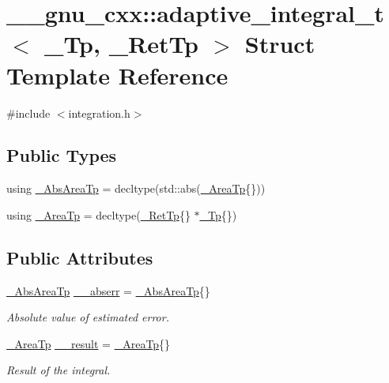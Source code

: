 \hypertarget{struct____gnu__cxx_1_1adaptive__integral__t}{}\section{\+\_\+\+\_\+gnu\+\_\+cxx\+:\+:adaptive\+\_\+integral\+\_\+t$<$ \+\_\+\+Tp, \+\_\+\+Ret\+Tp $>$ Struct Template Reference}
\label{struct____gnu__cxx_1_1adaptive__integral__t}


{\ttfamily \#include $<$integration.\+h$>$}

\subsection*{Public Types}
\begin{DoxyCompactItemize}
\item 
using \hyperlink{struct____gnu__cxx_1_1adaptive__integral__t_a2da7a99af03e272efd03b876a6b28308}{\+\_\+\+Abs\+Area\+Tp} = decltype(std\+::abs(\hyperlink{struct____gnu__cxx_1_1adaptive__integral__t_a9371ae517b6bff468e44130718d90f8b}{\+\_\+\+Area\+Tp}\{\}))
\item 
using \hyperlink{struct____gnu__cxx_1_1adaptive__integral__t_a9371ae517b6bff468e44130718d90f8b}{\+\_\+\+Area\+Tp} = decltype(\hyperlink{namespace____gnu__cxx_a886e03ece3d53ff7fa6c098a40f93fa5}{\+\_\+\+Ret\+Tp}\{\} $\ast$\hyperlink{namespace____gnu__cxx_a3b19a9c800ca194374ef9172290f7d79}{\+\_\+\+Tp}\{\})
\end{DoxyCompactItemize}
\subsection*{Public Attributes}
\begin{DoxyCompactItemize}
\item 
\hyperlink{struct____gnu__cxx_1_1adaptive__integral__t_a2da7a99af03e272efd03b876a6b28308}{\+\_\+\+Abs\+Area\+Tp} \hyperlink{struct____gnu__cxx_1_1adaptive__integral__t_aa0edf7f036470e8eaaaa1d5e5126d8b3}{\+\_\+\+\_\+abserr} = \hyperlink{struct____gnu__cxx_1_1adaptive__integral__t_a2da7a99af03e272efd03b876a6b28308}{\+\_\+\+Abs\+Area\+Tp}\{\}
\begin{DoxyCompactList}\small\item\em Absolute value of estimated error. \end{DoxyCompactList}\item 
\hyperlink{struct____gnu__cxx_1_1adaptive__integral__t_a9371ae517b6bff468e44130718d90f8b}{\+\_\+\+Area\+Tp} \hyperlink{struct____gnu__cxx_1_1adaptive__integral__t_ab868081e535832031b0e75d0e4d0197d}{\+\_\+\+\_\+result} = \hyperlink{struct____gnu__cxx_1_1adaptive__integral__t_a9371ae517b6bff468e44130718d90f8b}{\+\_\+\+Area\+Tp}\{\}
\begin{DoxyCompactList}\small\item\em Result of the integral. \end{DoxyCompactList}\end{DoxyCompactItemize}


